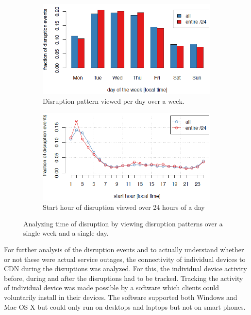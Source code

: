 \documentclass[11pt,twoside,a4paper]{article}
\begin{document}
\begin{figure}[h!]
  \centering
  \begin{subfigure}[b]{0.47\linewidth}
    \includegraphics[width=\linewidth]{Figures/5a.png}
    \caption{Disruption pattern viewed per day over a week.}
  \end{subfigure}
  \begin{subfigure}[b]{0.47\linewidth}
    \includegraphics[width=\linewidth]{Figures/5b.png}
    \caption{Start hour of disruption viewed over 24 hours of a day}
  \end{subfigure}
  \caption{Analyzing time of disruption by viewing disruption patterns over a single week and a single day.}
  \label{fig:coffee}
\end{figure}

For further analysis of the disruption events and to actually understand whether or not these were actual service outages, the connectivity of individual devices to CDN during the disruptions was analyzed. For this, the individual device activity before, during and after the disruptions had to be tracked. Tracking the activity of individual device was made possible by a software which clients could voluntarily install in their devices. The software supported both Windows and Mac OS X but could only run on desktops and laptops but not on smart phones.  
\end{document}
